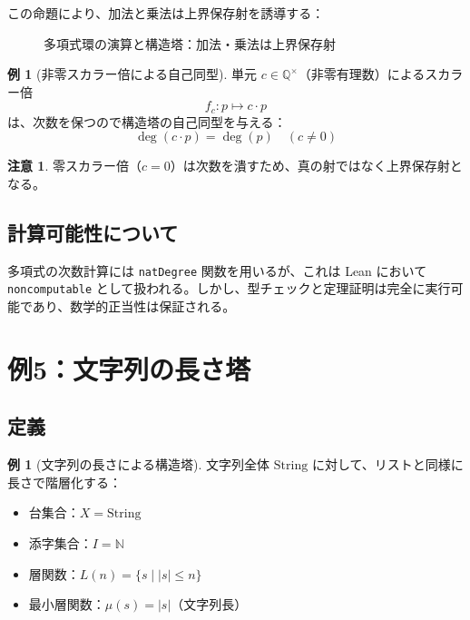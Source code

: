 \documentclass[a4paper,12pt]{ltjsarticle}
\theoremstyle{definition}
\newtheorem{example}[definition]{例}
\newtheorem{remark}[definition]{注意}
\begin{document}
この命題により、加法と乗法は上界保存射を誘導する：

\begin{figure}[h]
\centering
{}
\caption{多項式環の演算と構造塔：加法・乗法は上界保存射}
\end{figure}

\begin{example}[非零スカラー倍による自己同型]
単元 $c \in \mathbb{Q}^{\times}$（非零有理数）によるスカラー倍
\[
f_c : p \mapsto c \cdot p
\]
は、次数を保つので構造塔の自己同型を与える：
\[
\deg(c \cdot p) = \deg(p) \quad (c \neq 0)
\]
\end{example}

\begin{remark}
零スカラー倍（$c = 0$）は次数を潰すため、真の射ではなく上界保存射となる。
\end{remark}

\subsection{計算可能性について}

多項式の次数計算には \texttt{natDegree} 関数を用いるが、これは Lean において \texttt{noncomputable} として扱われる。しかし、型チェックと定理証明は完全に実行可能であり、数学的正当性は保証される。

\section{例5：文字列の長さ塔}

\subsection{定義}

\begin{example}[文字列の長さによる構造塔]
\label{ex:string-length}
文字列全体 $\mathrm{String}$ に対して、リストと同様に長さで階層化する：
\begin{itemize}
\item 台集合：$X = \mathrm{String}$
\item 添字集合：$I = \mathbb{N}$
\item 層関数：$L(n) = \{s \mid |s| \leq n\}$
\item 最小層関数：$\mu(s) = |s|$（文字列長）
\end{itemize}
\end{example}
\end{document}

